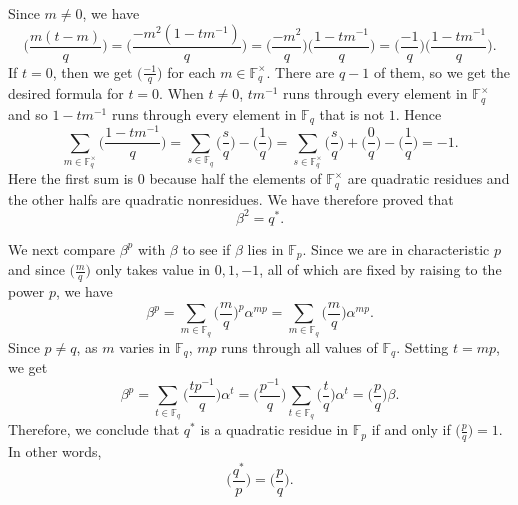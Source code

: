 \documentclass{article}
\def\F{{\mathbb F}}
\def\F{{\mathbb F}}
\renewcommand{\lg}[2]{\Big(\frac{#1}{#2}\Big)}
\newcommand{\leg}[2]{\Big(\frac{#1}{#2}\Big)}
\begin{document}
Since $m\neq0$, we have
$$\leg{m(t-m)}{q} = \leg{-m^2(1-tm^{-1})}{q} = \leg{-m^2}{q}\leg{1-tm^{-1}}{q} = \leg{-1}{q}\leg{1-tm^{-1}}{q}.$$ 
If $t = 0$, then we get $\lg{-1}{q}$ for each $m\in\F_q^\times$. There are $q-1$ of them, so we get the desired formula for $t = 0$. When $t\neq 0$, $tm^{-1}$ runs through every element in $\F_q^\times$ and so $1 - tm^{-1}$ runs through every element in $\F_q$ that is not $1$. Hence
$$\sum_{m\in\F_q^\times}\leg{1-tm^{-1}}{q} = \sum_{s\in\F_q}\leg{s}{q} - \leg{1}{q} = \sum_{s\in\F_q^\times}\leg{s}{q} + \leg{0}{q} - \leg{1}{q} = -1.$$
Here the first sum is $0$ because half the elements of $\F_q^\times$ are quadratic residues and the other halfs are quadratic nonresidues. We have therefore proved that 
$$\beta^2 = q^*.$$


We next compare $\beta^p$ with $\beta$ to see if $\beta$ lies in $\F_p$. Since we are in characteristic $p$ and since $\lg{m}{q}$ only takes value in $0,1,-1$, all of which are fixed by raising to the power $p$, we have
$$\beta^p = \sum_{m\in\F_q}\leg{m}{q}^p\alpha^{mp} = \sum_{m\in\F_q}\leg{m}{q}\alpha^{mp}.$$
Since $p\neq q$, as $m$ varies in $\F_q$, $mp$ runs through all values of $\F_q$. Setting $t = mp$, we get
$$\beta^p = \sum_{t\in\F_q} \lg{tp^{-1}}{q}\alpha^t = \lg{p^{-1}}{q}\sum_{t\in\F_q} \lg{t}{q}\alpha^t = \lg{p}{q}\beta.$$
Therefore, we conclude that $q^*$ is a quadratic residue in $\F_p$ if and only if $\lg{p}{q} = 1$. In other words,
$$\lg{q^*}{p} = \lg{p}{q}.$$

\begin{comment}
    \noindent\textbf{Proof of Proposition \ref{prop:qr2}}: In light of quadratic reciprocity, it remains to prove that $p^* = (-1)^{(p-1)/2}p$ is a square mod $q$ if and only if $p\equiv \pm a^2\pmod{4q}$ for some odd integer $a$. This is basically just the definition.

If $p\equiv 1\pmod{4}$, then $p^* = p$. If $p$ is a square mod $q$, then $p\equiv b^2\pmod{q}$ for some integer $b$. By Chinese remainder theorem, there exists an integer $a$ that is 1 mod 4 and $b$ mod $q$. So $p\equiv a^2\pmod{4q}$. Since $p$ is odd and $4q$ is even, we have $a$ is odd. Conversely, if $p\equiv \pm a^2\pmod{4q}$ for some odd integer $a$. If $p\equiv -a^2\pmod{4q}$, then $p\equiv -a^2\pmod{4}$ but $a^2\equiv p \equiv 1\pmod{4}$, which is impossible. So $p\equiv a^2\pmod{4q}$ and thus $p\equiv a^2\pmod{q}$.

The case for $p\equiv 3\pmod{4}$ is similar. \hspace{20pt}$\Box$
\end{comment}
\end{document}
